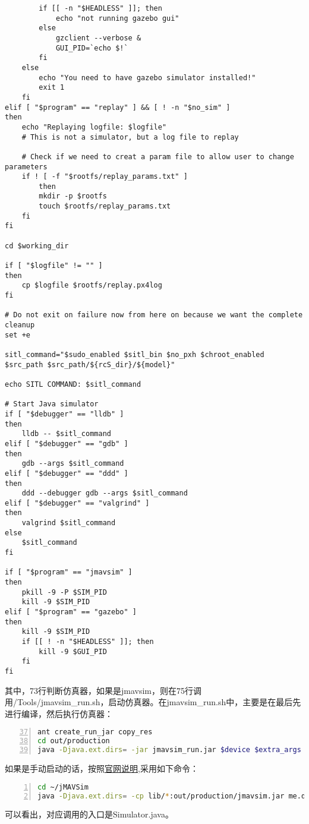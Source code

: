 \begin{lstlisting}
		if [[ -n "$HEADLESS" ]]; then
			echo "not running gazebo gui"
		else
			gzclient --verbose &
			GUI_PID=`echo $!`
		fi
	else
		echo "You need to have gazebo simulator installed!"
		exit 1
	fi
elif [ "$program" == "replay" ] && [ ! -n "$no_sim" ]
then
	echo "Replaying logfile: $logfile"
	# This is not a simulator, but a log file to replay

	# Check if we need to creat a param file to allow user to change parameters
	if ! [ -f "$rootfs/replay_params.txt" ]
		then
		mkdir -p $rootfs
		touch $rootfs/replay_params.txt
	fi
fi

cd $working_dir

if [ "$logfile" != "" ]
then
	cp $logfile $rootfs/replay.px4log
fi

# Do not exit on failure now from here on because we want the complete cleanup
set +e

sitl_command="$sudo_enabled $sitl_bin $no_pxh $chroot_enabled $src_path $src_path/${rcS_dir}/${model}"

echo SITL COMMAND: $sitl_command

# Start Java simulator
if [ "$debugger" == "lldb" ]
then
	lldb -- $sitl_command
elif [ "$debugger" == "gdb" ]
then
	gdb --args $sitl_command
elif [ "$debugger" == "ddd" ]
then
	ddd --debugger gdb --args $sitl_command
elif [ "$debugger" == "valgrind" ]
then
	valgrind $sitl_command
else
	$sitl_command
fi

if [ "$program" == "jmavsim" ]
then
	pkill -9 -P $SIM_PID
	kill -9 $SIM_PID
elif [ "$program" == "gazebo" ]
then
	kill -9 $SIM_PID
	if [[ ! -n "$HEADLESS" ]]; then
		kill -9 $GUI_PID
	fi
fi
\end{lstlisting}
其中，73行判断仿真器，如果是jmavsim，则在75行调用/Tools/jmavsim_run.sh，启动仿真器。在jmavsim_run.sh中，主要是在最后先进行编译，然后执行仿真器：
\begin{lstlisting}[language=bash,numbers=left,firstnumber = 37,breaklines = true,numberstyle=\tiny,keywordstyle=\color{blue!70},commentstyle=\color{red!50!green!50!blue!50},frame=shadowbox, rulesepcolor=\color{red!20!green!20!blue!20}]
ant create_run_jar copy_res
cd out/production
java -Djava.ext.dirs= -jar jmavsim_run.jar $device $extra_args
\end{lstlisting}
如果是手动启动的话，按照\href{http://www.pixhawk.com/dev/hil/jmavsim#hardware_in_the_loop_hitl}{官网说明},采用如下命令：
\begin{lstlisting}[language=bash,numbers=left,firstnumber = 1,breaklines = true,numberstyle=\tiny,keywordstyle=\color{blue!70},commentstyle=\color{red!50!green!50!blue!50},frame=shadowbox, rulesepcolor=\color{red!20!green!20!blue!20}]
cd ~/jMAVSim
java -Djava.ext.dirs= -cp lib/*:out/production/jmavsim.jar me.drton.jmavsim.Simulator -udp 127.0.0.1:14560   
\end{lstlisting} 
可以看出，对应调用的入口是Simulator.java。

